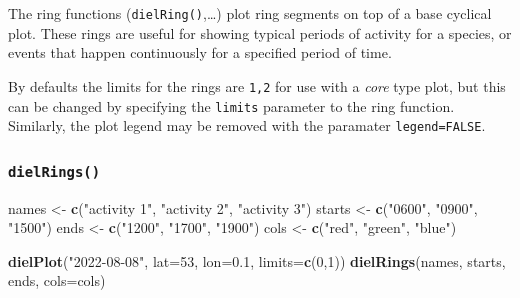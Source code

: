 \documentclass[
]{book}
\newenvironment{Shaded}{\begin{snugshade}}{\end{snugshade}}
\newcommand{\AttributeTok}[1]{\textcolor[rgb]{0.13,0.29,0.53}{#1}}
\newcommand{\DecValTok}[1]{\textcolor[rgb]{0.00,0.00,0.81}{#1}}
\newcommand{\FloatTok}[1]{\textcolor[rgb]{0.00,0.00,0.81}{#1}}
\newcommand{\FunctionTok}[1]{\textcolor[rgb]{0.13,0.29,0.53}{\textbf{#1}}}
\newcommand{\NormalTok}[1]{#1}
\newcommand{\OtherTok}[1]{\textcolor[rgb]{0.56,0.35,0.01}{#1}}
\newcommand{\StringTok}[1]{\textcolor[rgb]{0.31,0.60,0.02}{#1}}
\begin{document}
The ring functions (\texttt{dielRing()},\ldots) plot ring segments on top of a base cyclical plot. These rings are useful for showing typical periods of activity for a species, or events that happen continuously for a specified period of time.

By defaults the limits for the rings are \texttt{1,2} for use with a \emph{core} type plot, but this can be changed by specifying the \texttt{limits} parameter to the ring function. Similarly, the plot legend may be removed with the paramater \texttt{legend=FALSE}.

\hypertarget{dielrings}{%
\subsubsection{\texorpdfstring{\texttt{dielRings()}}{dielRings()}}\label{dielrings}}

\begin{Shaded}
\begin{Highlighting}[]
\NormalTok{names }\OtherTok{\textless{}{-}} \FunctionTok{c}\NormalTok{(}\StringTok{"activity 1"}\NormalTok{, }\StringTok{"activity 2"}\NormalTok{, }\StringTok{"activity 3"}\NormalTok{)}
\NormalTok{starts }\OtherTok{\textless{}{-}} \FunctionTok{c}\NormalTok{(}\StringTok{"0600"}\NormalTok{, }\StringTok{"0900"}\NormalTok{, }\StringTok{"1500"}\NormalTok{)}
\NormalTok{ends }\OtherTok{\textless{}{-}} \FunctionTok{c}\NormalTok{(}\StringTok{"1200"}\NormalTok{, }\StringTok{"1700"}\NormalTok{, }\StringTok{"1900"}\NormalTok{)}
\NormalTok{cols }\OtherTok{\textless{}{-}} \FunctionTok{c}\NormalTok{(}\StringTok{"red"}\NormalTok{, }\StringTok{"green"}\NormalTok{, }\StringTok{"blue"}\NormalTok{)}

\FunctionTok{dielPlot}\NormalTok{(}\StringTok{"2022{-}08{-}08"}\NormalTok{, }\AttributeTok{lat=}\DecValTok{53}\NormalTok{, }\AttributeTok{lon=}\FloatTok{0.1}\NormalTok{, }\AttributeTok{limits=}\FunctionTok{c}\NormalTok{(}\DecValTok{0}\NormalTok{,}\DecValTok{1}\NormalTok{))}
\FunctionTok{dielRings}\NormalTok{(names, starts, ends, }\AttributeTok{cols=}\NormalTok{cols)}
\end{Highlighting}
\end{Shaded}
\end{document}
